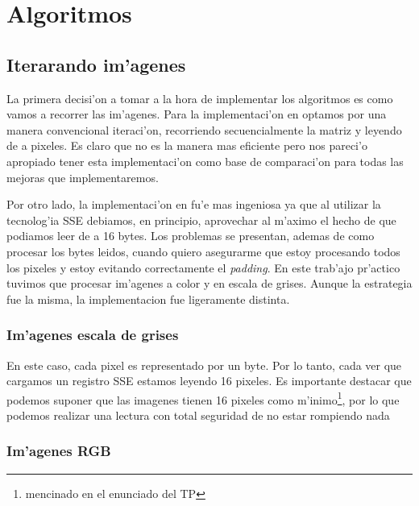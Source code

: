 \section{Algoritmos}

\subsection{Iterarando im'agenes}
La primera decisi'on a tomar a la hora de implementar los algoritmos es como vamos a recorrer las im'agenes. Para la implementaci'on en \C optamos por una manera convencional iteraci'on, recorriendo secuencialmente la matriz y leyendo de a pixeles. Es claro que no es la manera mas eficiente pero nos pareci'o apropiado tener esta implementaci'on como base de comparaci'on para todas las mejoras que implementaremos.

Por otro lado, la implementaci'on en \ass fu'e mas ingeniosa ya que al utilizar la tecnolog'ia SSE debiamos, en principio, aprovechar al m'aximo el hecho de que podiamos leer de a 16 bytes. Los problemas se presentan, ademas de como procesar los bytes leidos, cuando quiero asegurarme que estoy procesando todos los pixeles y estoy evitando correctamente el \textit{padding}. En este trab'ajo pr'actico tuvimos que procesar im'agenes a color y en escala de grises. Aunque la estrategia fue la misma, la implementacion fue ligeramente distinta. 

\subsubsection{Im'agenes escala de grises}
En este caso, cada pixel es representado por un byte. Por lo tanto, cada ver que cargamos un registro SSE estamos leyendo 16 pixeles. Es importante destacar que podemos suponer que las imagenes tienen 16 pixeles como m'inimo\footnote{mencinado en el enunciado del TP}, por lo que podemos realizar una lectura con total seguridad de no estar rompiendo nada 

\subsubsection{Im'agenes RGB}
